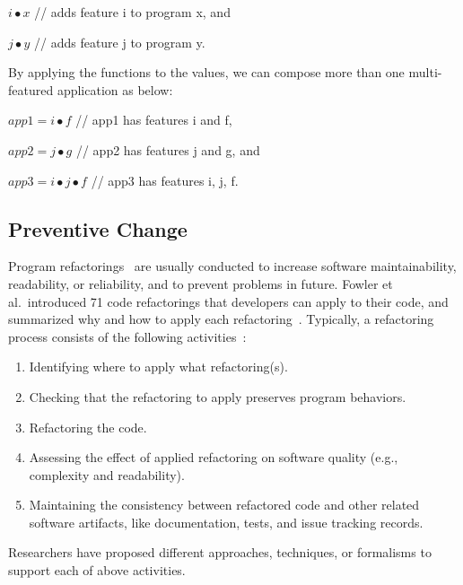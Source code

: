 \documentclass[runningheads,a4paper]{llncs}
\begin{document}
$i \bullet x$ // adds feature i to program x, and 

$j \bullet y$ // adds feature j to program y.

By applying the functions to the values, we can compose more than one multi-featured application as below:

$app1 = i \bullet f$ // app1 has features i and f,

$app2 = j \bullet g$ // app2 has features j and g, and
 
$app3 = i \bullet j \bullet f$ // app3 has features i, j, f.

\subsection{Preventive Change}
\label{sec:preventive}
Program refactorings~\cite{Fowler1999:refactoring} are usually conducted to increase software maintainability, readability, or reliability, and to prevent problems in future. Fowler et al.~introduced 71 code refactorings that developers can apply to their code, and summarized why and how to apply each refactoring~\cite{Fowler1999:refactoring}. Typically, a refactoring process consists of the following activities~\cite{Mens2004:SSR}:
\begin{enumerate}
\item Identifying where to apply what refactoring(s).
\item Checking that the refactoring to apply preserves program behaviors.
\item Refactoring the code.
\item Assessing the effect of applied refactoring on software quality (e.g., complexity and readability). 
\item Maintaining the consistency between refactored code and other related software artifacts, like documentation, tests, and issue tracking records.  
\end{enumerate}

Researchers have proposed different approaches, techniques, or formalisms to support each of above activities.
\end{document}
